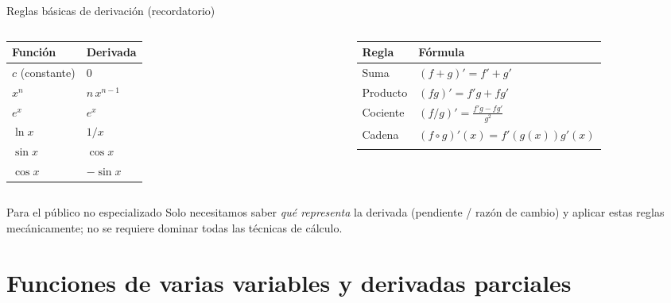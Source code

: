 \documentclass[aspectratio=169,10pt]{beamer}
\begin{document}
\begin{frame}{Reglas básicas de derivación (recordatorio)}
  \small
  \begin{columns}
    \begin{table}
      \begin{tabular}{ll}
        \toprule
        Función & Derivada \\
        \midrule
        $c$ (constante) & $0$ \\
        $x^n$ & $n\,x^{n-1}$ \\
        $e^x$ & $e^x$ \\
        $\ln x$ & $1/x$ \\
        $\sin x$ & $\cos x$ \\
        $\cos x$ & $-\sin x$ \\
        \bottomrule
      \end{tabular}
    \end{table}
    \begin{table}
      \begin{tabular}{ll}
        \toprule
        Regla & Fórmula \\
        \midrule
        Suma & $(f+g)'=f'+g'$ \\
        Producto & $(fg)'=f'g+fg'$ \\
        Cociente & $(f/g)'=\frac{f'g-fg'}{g^2}$ \\
        Cadena & $(f\circ g)'(x)=f'(g(x))g'(x)$ \\
        &\\
        \bottomrule
      \end{tabular}
    \end{table}
  \end{columns}
  \vspace{0.2cm}
  \begin{alertblock}{Para el público no especializado}
    Solo necesitamos saber \emph{qué representa} la derivada (pendiente /
    razón de cambio) y aplicar estas reglas mecánicamente; no se requiere
    dominar todas las técnicas de cálculo.
  \end{alertblock}
\end{frame}

\section{Funciones de varias variables y derivadas parciales}
\end{document}
